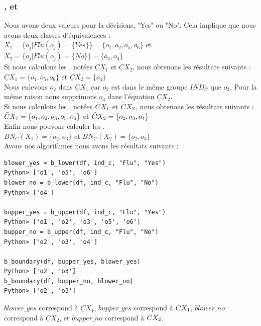\subsubsection{\blower, \bupper et \bboundary}
Nous avons deux valeurs pour la décisions,
"Yes" ou "No". Cela implique que nous avons deux classes
d'équivalences : \\
$X_1 = \{o_j | Flu(o_j) = \{Yes\}\} = \{o_1, o_2, o_5, o_6\}$ et
$X_2 = \{o_j | Flu(o_j) = \{No\}\} = \{o_3, o_4\}$ \\
Si nous calculons les \blower, notées $\underline{C}X_1$ et
$\underline{C}X_2$, nous obtenons les résultats suivants : \\
$\underline{C}X_1 = \{o_1, o_5, o_6\}$ et
$\underline{C}X_2 = \{o_4\}$ \\
Nous enlevons $o_2$ dans $\underline{C}X_1$ car $o_2$ est dans le même
groupe $IND_C$ que $o_3$. Pour la même raison nous supprimons $o_3$
dans l'équation $\underline{C}X_2$. \\
Si nous calculons les \bupper, notées $\Bar{C}X_1$ et
$\Bar{C}X_2$, nous obtenons les résultats suivants : \\
$\Bar{C}X_1 = \{o_1, o_2, o_3, o_5, o_6\}$ et
$\Bar{C}X_2 = \{o_2, o_3, o_4\}$ \\
Enfin nous pouvons calculer les \bboundary. \\
$BN_C(X_1) = \{o_2, o_3\} $ et $BN_C(X_2) = \{o_2, o_3\}$\\
Avons nos algorithmes nous avons les résultats suivants :
\begin{lstlisting}
blower_yes = b_lower(df, ind_c, "Flu", "Yes")
Python> ['o1', 'o5', 'o6']
blower_no = b_lower(df, ind_c, "Flu", "No")
Python> ['o4']

bupper_yes = b_upper(df, ind_c, "Flu", "Yes")
Python> ['o1', 'o2', 'o3', 'o5', 'o6']
bupper_no = b_upper(df, ind_c, "Flu", "No")
Python> ['o2', 'o3', 'o4']

b_boundary(df, bupper_yes, blower_yes)
Python> ['o2', 'o3']
b_boundary(df, bupper_no, blower_no)
Python> ['o2', 'o3']
\end{lstlisting}
$blower\_yes$ correspond à $\underline{C}X_1$, $bupper\_yes$ correspond
à $\Bar{C}X_1$, $blower\_no$ correspond à $\underline{C}X_2$, et
$bupper\_no$ correspond à $\Bar{C}X_2$. \\
